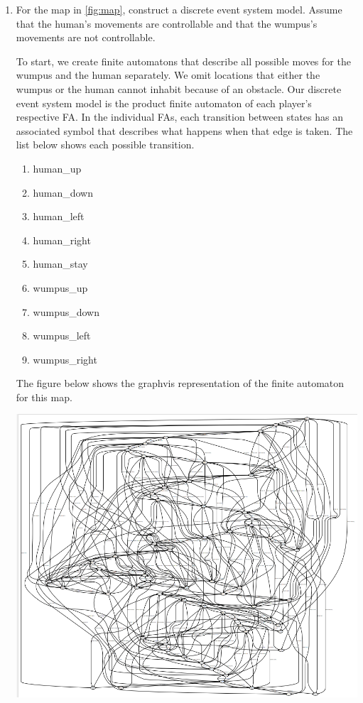 \documentclass[12pt,letterpaper]{ntdhw}
\begin{document}
\begin{enumerate}

  \item For the map in \autoref{fig:map}, construct a discrete event
  system model.  Assume that the human's movements are controllable
  and that the wumpus's movements are not controllable.
  
To start, we create finite automatons that describe all possible moves for the wumpus and the human separately. We omit locations that either the wumpus or the human cannot inhabit because of an obstacle. Our discrete event system model is the product finite automaton of each player's respective FA. In the individual FAs, each transition between states has an associated symbol that describes what happens when that edge is taken. The list below shows each possible transition.
\begin{enumerate}
    \item human\_up
    \item human\_down
    \item human\_left
    \item human\_right
    \item human\_stay
    \item wumpus\_up
    \item wumpus\_down
    \item wumpus\_left
    \item wumpus\_right
    
\end{enumerate}The figure below shows the graphvis representation of the finite automaton for this map.

\begin{center}
\includegraphics[scale=0.5]{Q2_graphviz.png}
\end{center}


\end{enumerate}
\end{document}
